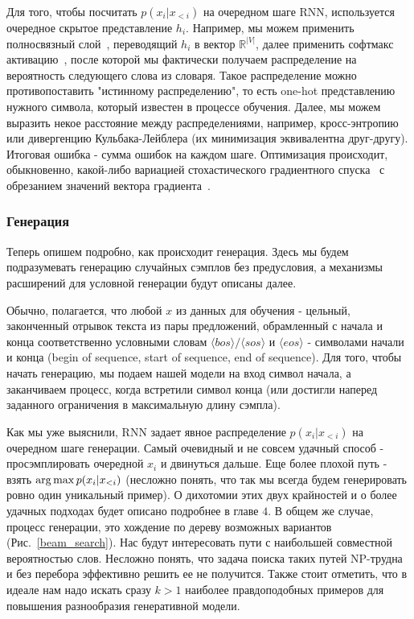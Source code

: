 \documentclass{spbau-diploma}
\begin{document}
Для того, чтобы посчитать $p(x_i|x_{<i})$ на очередном шаге RNN, используется 
очередное скрытое представление $h_i$. Например, мы можем применить полносвязный
слой~\cite{cnn}, переводящий $h_i$ в вектор $\mathbb{R}^{|V|}$, далее применить 
софтмакс активацию~\cite{wiki:softmax}, после которой мы фактически получаем 
распределение на вероятность следующего слова из словаря. 
Такое распределение можно 
противопоставить "истинному распределению", то есть one-hot представлению 
нужного символа, который известен в процессе обучения. 
Далее, мы можем выразить некое 
расстояние между распределениями, например, кросс-энтропию или дивергенцию 
Кульбака-Лейблера (их минимизация эквивалентна друг-другу). Итоговая ошибка - 
сумма ошибок на каждом шаге. Оптимизация происходит, обыкновенно, какой-либо 
вариацией стохастического градиентного спуска~\cite{optimizers} с обрезанием 
значений вектора градиента~\cite{gradient_clipping}.

\subsubsection{Генерация}
Теперь опишем подробно, как происходит генерация. Здесь мы будем 
подразумевать генерацию случайных сэмплов без предусловия, а механизмы 
расширений для условной генерации будут описаны далее.

\newcommand{\bos}{\langle bos \rangle}
\newcommand{\sos}{\langle sos \rangle}
\newcommand{\eos}{\langle eos \rangle}
\newcommand{\unk}{\langle unk \rangle}
\newcommand{\pad}{\langle pad \rangle}
Обычно, полагается, что любой $x$ из данных для обучения - цельный, законченный 
отрывок текста из пары предложений, обрамленный с начала и конца соответственно 
условными словам $\bos/\sos$ и $\eos$ - символами начали и конца (begin of 
sequence, start of sequence, end of sequence). Для того, чтобы начать генерацию, 
мы подаем нашей модели на вход символ начала, а заканчиваем процесс, когда 
встретили символ конца (или достигли наперед заданного ограничения в 
максимальную длину сэмпла).

Как мы уже выяснили, RNN задает явное распределение $p(x_i|x_{<i})$ на очередном
шаге генерации. Самый очевидный и не совсем удачный способ - просэмплировать
очередной $x_i$ и двинуться дальше. Еще более плохой путь - взять 
$\operatorname*{arg\,max} p(x_i|x_{<i})$ (несложно понять, что так мы всегда будем 
генерировать ровно один уникальный пример). О дихотомии этих двух крайностей и 
о более удачных подходах будет описано подробнее в главе $4$. В общем же 
случае, процесс генерации, это хождение по дереву возможных вариантов
(Рис.~\ref{beam_search}). Нас будут интересовать пути с наибольшей совместной 
вероятностью слов. Несложно понять, что задача поиска таких путей NP-трудна и 
без перебора эффективно решить ее не получится. Также стоит отметить, что в 
идеале нам надо искать сразу $k > 1$ наиболее правдоподобных примеров для повышения
разнообразия генеративной модели.
\end{document}
